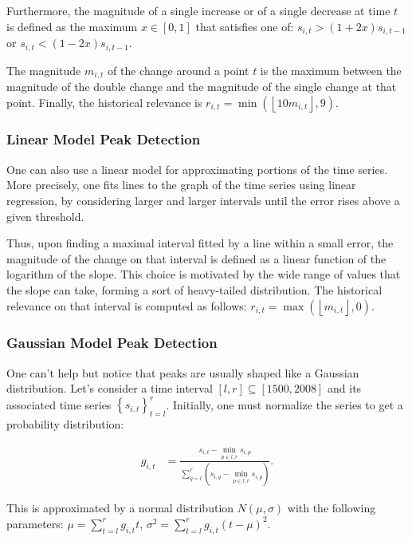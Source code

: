 Furthermore, the magnitude of a single increase or of a single decrease at time $t$ is defined as the maximum $x \in \left[ 0, 1 \right]$ that satisfies one of: $s_{i, t} > \left( 1 + 2x \right) s_{i, t - 1}$ or $s_{i, t} < \left( 1 - 2x \right) s_{i, t - 1}$.

The magnitude $m_{i, t}$ of the change around a point $t$ is the maximum between the magnitude of the double change and the magnitude of the single change at that point. Finally, the historical relevance is $r_{i, t} = \min \left( \left\lfloor 10 m_{i, t} \right\rfloor, 9 \right)$.

\subsubsection{Linear Model Peak Detection}

One can also use a linear model for approximating portions of the time series. More precisely, one fits lines to the graph of the time series using linear regression, by considering larger and larger intervals until the error rises above a given threshold.

Thus, upon finding a maximal interval fitted by a line within a small error, the magnitude of the change on that interval is defined as a linear function of the logarithm of the slope. This choice is motivated by the wide range of values that the slope can take, forming a sort of heavy-tailed distribution. The historical relevance on that interval is computed as follows: $r_{i, t} = \max \left( \left\lfloor m_{i, t} \right\rfloor, 0 \right)$.

\subsubsection{Gaussian Model Peak Detection}

One can't help but notice that peaks are usually shaped like a Gaussian distribution. Let's consider a time interval $\left[ l, r \right] \subseteq \left[ 1500, 2008 \right]$ and its associated time series $\left\{ s_{i, t} \right\}_{t=l}^{r}$. Initially, one must normalize the series to get a probability distribution:

\begin{align}
\label{eq:gaussian-normalization}
g_{i, t} &= \frac{s_{i, t} - \min_{p \in \overline{l, r}} s_{i, p}}{\sum_{q = l}^{r} \left( s_{i, q} - \min_{p \in \overline{l, r}} s_{i, p} \right)}.
\end{align}

This is approximated by a normal distribution $N \left( \mu, \sigma \right)$ with the following parameters: $\mu = \sum_{t=l}^{r} g_{i, t} t$, $\sigma^2 = \sum_{t=l}^{r} g_{i, t} \left( t - \mu \right)^2$.


